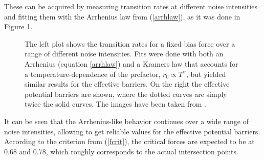 \documentclass[12pt,a4paper]{article}
\begin{document}
These can be acquired by measuring transition rates at different noise intensities and fitting them with the Arrhenius law from (\ref{arrhlaw}), as it was done in Figure \ref{ratesintro}.
\begin{figure}[H]
	\caption{The left plot shows the transition rates for a fixed bias force over a range of different noise intensities. Fits were done with both an Arrhenius (equation \ref{arrhlaw}) and a Kramers law that accounts for a temperature-dependence of the prefactor, $r_0\propto T^\alpha$, but yielded similar results for the effective barriers. On the right the effective potential barriers are shown, where the dotted curves are simply twice the solid curves.  The images have been taken from \cite{bpp}.}
	\label{ratesintro} 
\end{figure}
It can be seen that the Arrhenius-like behavior continues over a wide range of noise intensities, allowing to get reliable values for the effective potential barriers. According to the criterion from (\ref{fcrit}), the critical forces are expected to be at 0.68 and 0.78, which roughly corresponds to the actual intersection points.\\
\end{document}
